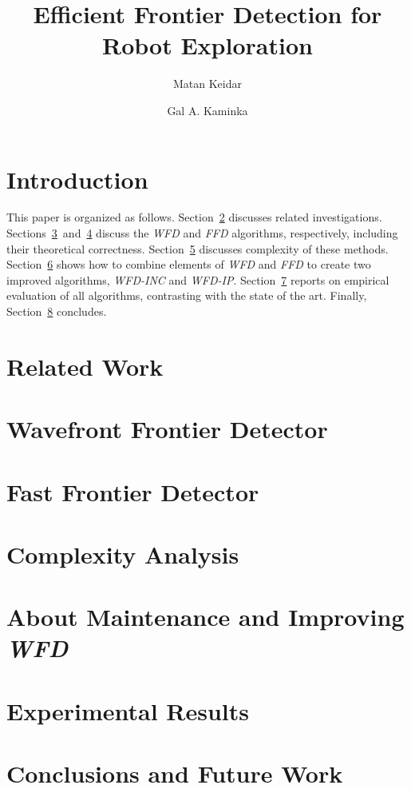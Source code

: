 \documentclass[a4paper]{article}
\def\FFD{\emph{FFD}\xspace}
\def\WFD{\emph{WFD}\xspace}
\def\WFDINC{\emph{WFD-INC}\xspace}
\def\WFDIP{\emph{WFD-IP}\xspace}
\begin{document}
\title{Efficient Frontier Detection for Robot Exploration}
\author{Matan Keidar \and Gal A. Kaminka}
\maketitle



\section{Introduction}
\label{chap:introduction}


This paper is organized as follows. Section~\ref{chap:related_work} discusses
related investigations. Sections~\ref{chap:wfd}~and~\ref{chap:ffd} discuss 
the \WFD and \FFD algorithms, respectively, including their theoretical
correctness. Section~\ref{chap:complexity}
discusses  complexity of these methods. 
Section~\ref{chap:maint} shows how to combine elements of \WFD and \FFD
to create two improved algorithms, \WFDINC and \WFDIP. Section~\ref{chap:results}
reports on empirical evaluation of all algorithms, contrasting with the
state of the art. Finally, Section~\ref{chap:conclusions} concludes.

\section{Related Work}
\label{chap:related_work}


\section{Wavefront Frontier Detector}
\label{chap:wfd}


\section{Fast Frontier Detector}
\label{chap:ffd}


\section{Complexity Analysis}
\label{chap:complexity}


\section{About Maintenance and Improving \WFD}
\label{chap:maint}


\section{Experimental Results}
\label{chap:results}


\section{Conclusions and Future Work}
\label{chap:conclusions}




\end{document}
